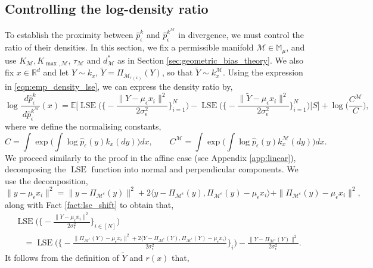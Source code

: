 \documentclass[10pt]{article}
\theoremstyle{plain}
\theoremstyle{definition}
\theoremstyle{remark}
\newcommand{\M}{{\mathcal{M}}}
\newcommand{\R}{\mathbb{R}}
\newcommand{\lse}{\operatorname{LSE}}
\newcommand{\E}{\mathbb{E}}
\newcommand{\Pieps}{\Pi_{\M^\epsilon}}
\begin{document}
\subsection{Controlling the log-density ratio}
To establish the proximity between $\hat{p}_{\epsilon}^k$ and $\hat{p}_{\epsilon}^{k^\M}$ in divergence, we must control the ratio of their densities. In this section, we fix a permissible manifold \(\M \in \mathbb{M}_\mu\), and use \(K_\M, K_{\max, \M}\), \(\tau_\M\) and \(d^*_\M\) as in Section \ref{sec:geometric_bias_theory}. We also fix \(x \in \R^d\) and let \(Y \sim k_x\), \(\tilde{Y} = \Pi_{\M_{r(x)}}(Y)\), so that \(\tilde{Y} \sim k^\M_x\). Using the expression in \eqref{eqn:emp_density_lse}, we can express the density ratio by,
\begin{equation}
    \log {\frac{d\hat{p}^k_\epsilon}{\ d\hat{p}^{k^\M}_\epsilon}}(x) = \E \bigg [ \lse \bigg ( \bigg \{ -\frac{\|Y - \mu_\epsilon x_i\|^2}{2 \sigma_\epsilon^2} \bigg\}_{i=1}^N \bigg ) - \lse \bigg ( \bigg \{ -\frac{\|\tilde{Y} - \mu_\epsilon x_i\|^2}{2 \sigma_\epsilon^2} \bigg\}_{i=1}^N \bigg ) \bigg | S \bigg ] + \log \bigg ( \frac{C^\M}{C} \bigg ),\label{eq:density_ratio_delta}
\end{equation}
where we define the normalising constants,
\begin{equation}
    C = \int \exp \bigg ( \int \log \hat{p}_\epsilon(y) k_x(dy) \bigg ) dx, \qquad C^\M = \int \exp \bigg ( \int \log \hat{p}_\epsilon(y) k^\M_x(dy) \bigg ) dx.\label{eq:pf_normalisation}
\end{equation}
We proceed similarly to the proof in the affine case (see Appendix \ref{app:linear}), decomposing the \(\lse\) function into normal and perpendicular components. We use the decomposition,
\begin{equation*}
    \|y - \mu_\epsilon x_i\|^2 = \|y - \Pieps(y)\|^2 + 2 \langle y - \Pieps(y), \Pieps(y) - \mu_\epsilon x_i \rangle + \|\Pieps(y)- \mu_\epsilon x_i\|^2,
\end{equation*}
along with Fact \ref{fact:lse_shift} to obtain that,
\begin{align*}
    &\lse \bigg ( \bigg \{ -\frac{\|Y - \mu_\epsilon x_i\|^2}{2 \sigma_\epsilon^2} \bigg\}_{i \in [N]} \bigg ) \\
    & \quad = \lse \bigg ( \bigg \{ -\frac{\|\Pieps(Y) - \mu_\epsilon x_i\|^2 + 2\langle Y - \Pieps(Y), \Pieps(Y) - \mu_\epsilon x_i \rangle}{2 \sigma_\epsilon^2} \bigg\}_{i} \bigg ) - \frac{\|Y - \Pieps(Y)\|^2}{2 \sigma_\epsilon^2}.
\end{align*}
It follows from the definition of \(\tilde{Y}\) and \(r(x)\) that,
\end{document}
